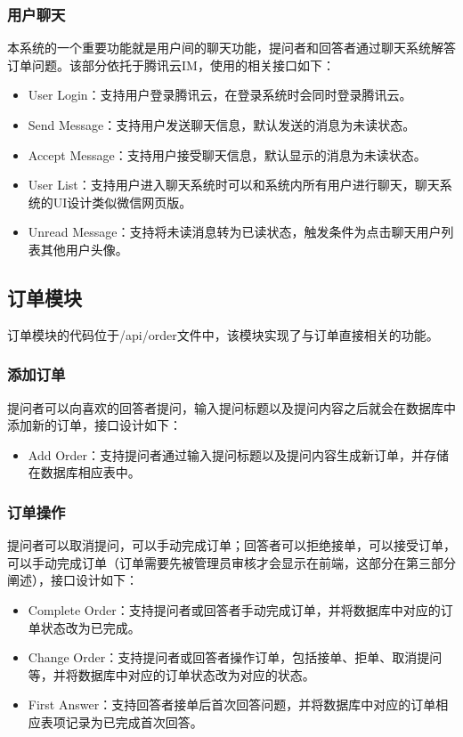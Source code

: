 \documentclass[12pt]{ctexart}
\begin{document}
\subsubsection{用户聊天}
本系统的一个重要功能就是用户间的聊天功能，提问者和回答者通过聊天系统解答订单问题。该部分依托于腾讯云IM，使用的相关接口如下：
\begin{itemize}
	\item User Login：支持用户登录腾讯云，在登录系统时会同时登录腾讯云。
	\item Send Message：支持用户发送聊天信息，默认发送的消息为未读状态。
	\item Accept Message：支持用户接受聊天信息，默认显示的消息为未读状态。
	\item User List：支持用户进入聊天系统时可以和系统内所有用户进行聊天，聊天系统的UI设计类似微信网页版。
	\item Unread Message：支持将未读消息转为已读状态，触发条件为点击聊天用户列表其他用户头像。
\end{itemize}
\subsection{订单模块}
订单模块的代码位于/api/order文件中，该模块实现了与订单直接相关的功能。
\subsubsection{添加订单}
提问者可以向喜欢的回答者提问，输入提问标题以及提问内容之后就会在数据库中添加新的订单，接口设计如下：
\begin{itemize}
	\item Add Order：支持提问者通过输入提问标题以及提问内容生成新订单，并存储在数据库相应表中。
\end{itemize}
\subsubsection{订单操作}
提问者可以取消提问，可以手动完成订单；回答者可以拒绝接单，可以接受订单，可以手动完成订单（订单需要先被管理员审核才会显示在前端，这部分在第三部分阐述），接口设计如下：
\begin{itemize}
	\item Complete Order：支持提问者或回答者手动完成订单，并将数据库中对应的订单状态改为已完成。
	\item Change Order：支持提问者或回答者操作订单，包括接单、拒单、取消提问等，并将数据库中对应的订单状态改为对应的状态。
	\item First Answer：支持回答者接单后首次回答问题，并将数据库中对应的订单相应表项记录为已完成首次回答。
\end{itemize}
\end{document}
